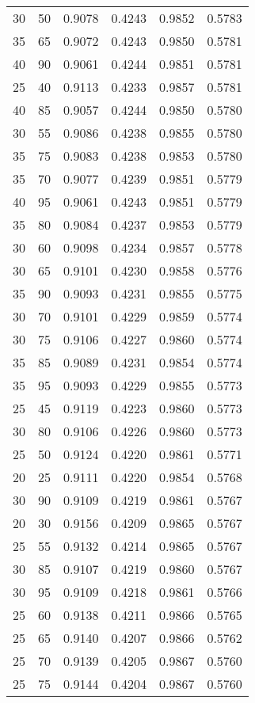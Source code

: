 \begin{center}
\begin{longtable}{|l|l|l|l|l|l|}
30 & 50 & 0.9078 & 0.4243 & 0.9852 & 0.5783 \\
35 & 65 & 0.9072 & 0.4243 & 0.9850 & 0.5781 \\
40 & 90 & 0.9061 & 0.4244 & 0.9851 & 0.5781 \\
25 & 40 & 0.9113 & 0.4233 & 0.9857 & 0.5781 \\
40 & 85 & 0.9057 & 0.4244 & 0.9850 & 0.5780 \\
30 & 55 & 0.9086 & 0.4238 & 0.9855 & 0.5780 \\
35 & 75 & 0.9083 & 0.4238 & 0.9853 & 0.5780 \\
35 & 70 & 0.9077 & 0.4239 & 0.9851 & 0.5779 \\
40 & 95 & 0.9061 & 0.4243 & 0.9851 & 0.5779 \\
35 & 80 & 0.9084 & 0.4237 & 0.9853 & 0.5779 \\
30 & 60 & 0.9098 & 0.4234 & 0.9857 & 0.5778 \\
30 & 65 & 0.9101 & 0.4230 & 0.9858 & 0.5776 \\
35 & 90 & 0.9093 & 0.4231 & 0.9855 & 0.5775 \\
30 & 70 & 0.9101 & 0.4229 & 0.9859 & 0.5774 \\
30 & 75 & 0.9106 & 0.4227 & 0.9860 & 0.5774 \\
35 & 85 & 0.9089 & 0.4231 & 0.9854 & 0.5774 \\
35 & 95 & 0.9093 & 0.4229 & 0.9855 & 0.5773 \\
25 & 45 & 0.9119 & 0.4223 & 0.9860 & 0.5773 \\
30 & 80 & 0.9106 & 0.4226 & 0.9860 & 0.5773 \\
25 & 50 & 0.9124 & 0.4220 & 0.9861 & 0.5771 \\
20 & 25 & 0.9111 & 0.4220 & 0.9854 & 0.5768 \\
30 & 90 & 0.9109 & 0.4219 & 0.9861 & 0.5767 \\
20 & 30 & 0.9156 & 0.4209 & 0.9865 & 0.5767 \\
25 & 55 & 0.9132 & 0.4214 & 0.9865 & 0.5767 \\
30 & 85 & 0.9107 & 0.4219 & 0.9860 & 0.5767 \\
30 & 95 & 0.9109 & 0.4218 & 0.9861 & 0.5766 \\
25 & 60 & 0.9138 & 0.4211 & 0.9866 & 0.5765 \\
25 & 65 & 0.9140 & 0.4207 & 0.9866 & 0.5762 \\
25 & 70 & 0.9139 & 0.4205 & 0.9867 & 0.5760 \\
25 & 75 & 0.9144 & 0.4204 & 0.9867 & 0.5760 \\

\end{longtable}
\end{center}
